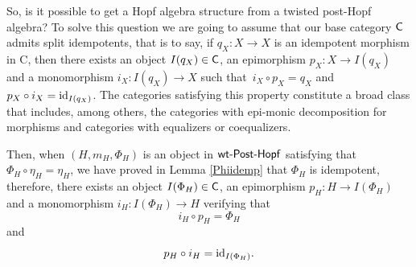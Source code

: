 \documentclass[10pt,a4paper]{amsart}
\numberwithin{equation}{section}
\begin{document}
So, is it possible to get a Hopf algebra structure from a twisted post-Hopf algebra? To solve this question we are going to assume that our base category $\sf{C}$ admits split idempotents, that is to say, if $q_{X}\colon X\rightarrow X$ is an idempotent morphism in {\sf C}, then there exists an object $I(q_{X})\in\sf{C}$, an epimorphism $p_{X}\colon X\rightarrow I(q_{X})$ and a monomorphism $i_{X}\colon I(q_{X})\rightarrow X$ such that~${i_{X}\circ p_{X}=q_{X}}$ and~${p_{X}\circ i_{X}={\rm id}_{I(q_{X})}}$. The categories satisfying this property constitute a broad class that includes, among others, the categories with epi-monic decomposition for morphisms and categories with equalizers or coequalizers.

Then, when $(H,m_{H},\Phi_{H})$ is an object in ${\sf wt}\textnormal{-}\sf{Post}\textnormal{-}\sf{Hopf}$ satisfying that $\Phi_{H}\circ\eta_{H}=\eta_{H}$, we have proved in Lemma \ref{Phiidemp} that $\Phi_{H}$ is idempotent, therefore, there exists an object $I(\Phi_{H})\in\sf{C}$, an epimorphism $p_{H}\colon H\rightarrow I(\Phi_{H})$ and a monomorphism $i_{H}\colon I(\Phi_{H})\rightarrow H$ verifying that
\begin{equation}\label{iconp}
i_{H}\circ p_{H}=\Phi_{H}
\end{equation}
and
\begin{equation}\label{pconi}
p_{H}\circ i_{H}={\rm id}_{I(\Phi_{H})}.
\end{equation}
\end{document}
